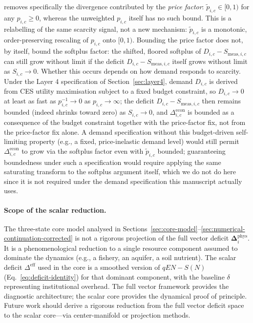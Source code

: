 \documentclass[twocolumn,10pt]{article}
\begin{document}
removes specifically the divergence contributed by the \emph{price factor}: $\tilde p_{i,c}\in[0,1)$ for any $p_{i,c}\ge0$, whereas the unweighted $p_{i,c}$ itself has no such bound. This is a relabelling of the same scarcity signal, not a new mechanism: $\tilde p_{i,c}$ is a monotonic, order-preserving rescaling of $p_{i,c}$ onto $[0,1)$. Bounding the price factor does not, by itself, bound the softplus factor: the shifted, floored softplus of $D_{i,c}-S_{\text{meas},i,c}$ can still grow without limit if the deficit $D_{i,c}-S_{\text{meas},i,c}$ itself grows without limit as $S_{i,c}\to0$. Whether this occurs depends on how demand responds to scarcity. Under the Layer 4 specification of Section~\ref{sec:layer4}, demand $D_{i,c}$ is derived from CES utility maximisation subject to a fixed budget constraint, so $D_{i,c}\to0$ at least as fast as $p_{i,c}^{-1}\to0$ as $p_{i,c}\to\infty$; the deficit $D_{i,c}-S_{\text{meas},i,c}$ then remains bounded (indeed shrinks toward zero) as $S_{i,c}\to0$, and $\Delta_{i,c}^{\text{econ}}$ is bounded as a consequence of the budget constraint together with the price-factor fix, not from the price-factor fix alone. A demand specification without this budget-driven self-limiting property (e.g., a fixed, price-inelastic demand level) would still permit $\Delta_{i,c}^{\text{econ}}$ to grow via the softplus factor even with $\tilde p_{i,c}$ bounded; guaranteeing boundedness under such a specification would require applying the same saturating transform to the softplus argument itself, which we do not do here since it is not required under the demand specification this manuscript actually uses.

\paragraph{Scope of the scalar reduction.}
The three-state core model analysed in Sections~\ref{sec:core-model}--\ref{sec:numerical-continuation-corrected} is not a rigorous projection of the full vector deficit \(\boldsymbol{\Delta}_{i}^{\text{phys}}\). It is a phenomenological reduction to a single resource component assumed to dominate the dynamics (e.g., a fishery, an aquifer, a soil nutrient). The scalar deficit \(\Delta^{\text{eff}}\) used in the core is a smoothed version of \(qEN - S(N)\) (Eq.~\eqref{eq:deficit-identity}) for that dominant component, with the baseline \(\delta\) representing institutional overhead. The full vector framework provides the diagnostic architecture; the scalar core provides the dynamical proof of principle. Future work should derive a rigorous reduction from the full vector deficit space to the scalar core---via center-manifold or projection methods.
\end{document}

